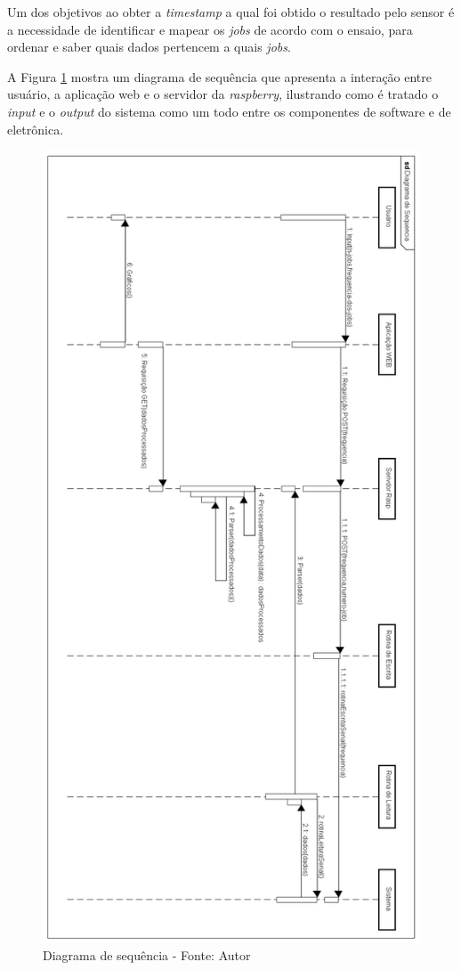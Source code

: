 Um dos objetivos ao obter a \textit{timestamp} a qual foi obtido o resultado pelo sensor é a necessidade de identificar e mapear os
\textit{jobs} de acordo com o ensaio, para ordenar e saber quais dados pertencem a quais \textit{jobs}.

A Figura \ref{fig:diagrama_sequencia_pc2} mostra um diagrama de sequência que apresenta a interação entre usuário, a aplicação web e o servidor da \textit{raspberry},
ilustrando como é tratado o \textit{input} e o \textit{output} do sistema como um todo entre os componentes de software e de eletrônica.

\begin{figure}[H]
\label{fig:diagrama_sequencia_pc2}
\centering
\includegraphics[keepaspectratio=true,scale=0.5]{figuras/diagrama_sequencia_pc2.png}
\caption{Diagrama de sequência - Fonte: Autor}
\end{figure}

